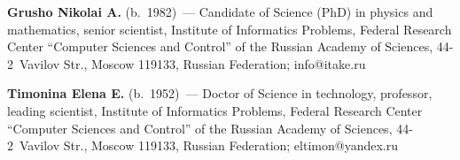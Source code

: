 \noindent
\textbf{Grusho Nikolai A.} (b.\ 1982)~--- Candidate of Science (PhD) in physics and 
mathematics, senior scientist, Institute of Informatics Problems, Federal Research 
Center ``Computer Sciences and Control'' of the Russian Academy of Sciences,  
44-2~Vavilov Str., Moscow 119133, Russian Federation; \mbox{info@itake.ru}

\vspace*{3pt}

\noindent
\textbf{Timonina Elena E.} (b.\ 1952)~--- Doctor of Science in technology, professor, 
leading scientist, Institute of Informatics Problems, Federal Research Center 
``Computer Sciences and Control'' of the Russian Academy of Sciences, 44-2~Vavilov 
Str., Moscow 119133, Russian Federation; \mbox{eltimon@yandex.ru} 
\label{end\stat}

\renewcommand{\bibname}{\protect\rm Литература}  